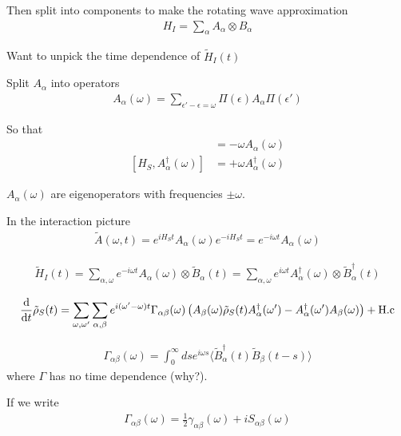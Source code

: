 Then split into components to make the rotating wave approximation
\begin{align}
  H_I = \sum_\alpha A_\alpha \otimes B_\alpha
\end{align}

Want to unpick the time dependence of $\tilde{H}_I(t)$

Split $A_\alpha$ into operators 
\begin{align}
  A_\alpha(\omega) = \sum_{\epsilon' - \epsilon = \omega} \Pi(\epsilon)A_\alpha \Pi(\epsilon')
\end{align}

So that
\begin{align}
  [H_S, A_\alpha(\omega)] &= - \omega A_\alpha(\omega) \\
  [H_S, A^\dagger_\alpha(\omega)] &= + \omega A^\dagger_\alpha(\omega)
\end{align}

$A_\alpha(\omega)$ are eigenoperators with frequencies $\pm \omega$.

In the interaction picture
\begin{align}
  \tilde{A}(\omega, t) = e^{iH_S t}A_\alpha(\omega) e^{-iH_S t} = e^{-i\omega t} A_\alpha(\omega)
\end{align}

\begin{align}
  \tilde{H}_I(t) = \sum_{\alpha, \omega} e^{-i \omega t} A_\alpha(\omega)\otimes \tilde{B}_\alpha(t) = \sum_{\alpha, \omega} e^{i \omega t} A^\dagger_\alpha(\omega)\otimes \tilde{B}^\dagger_\alpha(t)
\end{align}

\begin{align}
  \frac{\mathrm{d}}{\mathrm{d}t} \tilde{\rho}_S(t) = \sum_{\omega, \omega'} \sum_{\alpha, \beta} e^{i(\omega'-\omega)t} \Gamma_{\alpha\beta}(\omega)\left(A_\beta(\omega)\tilde{\rho}_S(t)A^\dagger_\alpha(\omega') - A^\dagger_\alpha(\omega')A_\beta(\omega)\right) + \text{H.c}
\end{align}

\begin{align}
  \Gamma_{\alpha\beta}(\omega) = \int_0^\infty ds e^{i\omega s} \langle \tilde{B}_\alpha^\dagger(t) \tilde{B}_\beta(t-s) \rangle
\end{align}
where $\Gamma$ has no time dependence (why?).

If we write
\begin{align}
  \Gamma_{\alpha \beta}(\omega) = \frac{1}{2}\gamma_{\alpha\beta}(\omega) + i S_{\alpha\beta}(\omega)
\end{align}


